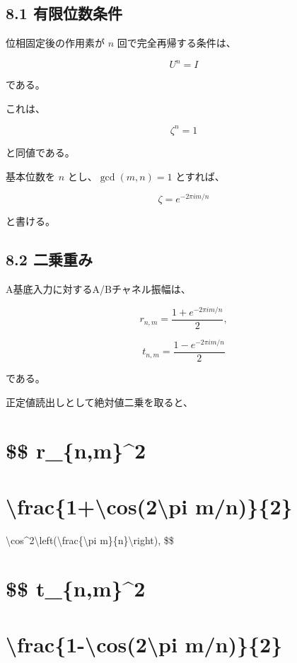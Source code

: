 \documentclass[
  a4paper,
  10pt]{article}
\begin{document}
\subsection{8.1
有限位数条件}\label{81-ux6709ux9650ux4f4dux6570ux6761ux4ef6}

位相固定後の作用素が \(n\) 回で完全再帰する条件は、

\[
U^n=I
\]

である。

これは、

\[
\zeta^n=1
\]

と同値である。

基本位数を \(n\) とし、\(\gcd(m,n)=1\) とすれば、

\[
\zeta=e^{-2\pi im/n}
\]

と書ける。

\subsection{8.2 二乗重み}\label{82-ux4e8cux4e57ux91cdux307f}

A基底入力に対するA/Bチャネル振幅は、

\[
r_{n,m}=\frac{1+e^{-2\pi im/n}}{2},
\]

\[
t_{n,m}=\frac{1-e^{-2\pi im/n}}{2}
\]

である。

正定値読出しとして絶対値二乗を取ると、

\section{\$\$ \textbar r\_\{n,m\}\textbar\^{}2}\label{-r_nm2}

\section{\textbackslash frac\{1+\textbackslash cos(2\textbackslash pi
m/n)\}\{2\}}\label{frac1cos2pi-mn2}

\textbackslash cos\^{}2\textbackslash left(\textbackslash frac\{\textbackslash pi
m\}\{n\}\textbackslash right), \$\$

\section{\$\$ \textbar t\_\{n,m\}\textbar\^{}2}\label{-t_nm2}

\section{\textbackslash frac\{1-\textbackslash cos(2\textbackslash pi
m/n)\}\{2\}}\label{frac1-cos2pi-mn2}
\end{document}
